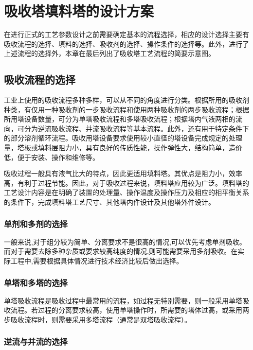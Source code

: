 \chapter{吸收塔填料塔的设计方案}

在进行正式的工艺参数设计之前需要确定基本的流程选择，相应的设计选择主要有吸收流程的选择、填料的选择、吸收剂的选择、操作条件的选择等。此外，进行了上述流程的选择外，本章在最后列出了吸收塔工艺流程的简要示意图。

\section{吸收流程的选择}

工业上使用的吸收流程多种多样，可以从不同的角度进行分类。根据所用的吸收剂种类，有仅用一种吸收剂的一步吸收流程和使用两种吸收剂的两步吸收流程；根据所用塔设备数量，可分为单塔吸收流程和多塔吸收流程；根据塔内气液两相的流向，可分为逆流吸收流程、并流吸收流程等基本流程。此外，还有用于特定条件下的部分溶剂循环流程。吸收用塔设备要求使用较小直径的塔设备完成规定的处理量，塔板或填料层阻力小，具有良好的传质性能，操作弹性大，结构简单，造价低，便于安装、操作和维修等。

吸收过程一般具有液气比大的特点，因此更适用填料塔。其优点是阻力小，效率高，有利于过程节能。因此，对于吸收过程来说，填料塔应用较为广泛。填料塔的工艺设计内容是在明确了装置的处理量、操作温度及操作压力及相应的相平衡关系的条件下，完成填料塔工艺尺寸、其他塔内件设计及其他塔外件设计。

\subsection{单剂和多剂的选择}

一般来说,对于组分较为简单、分离要求不是很高的情况,可以优先考虑单剂吸收。而对于需要去除多种杂质或要求较高纯度的情况,则可能需要采用多剂吸收。在实际工程中,需要根据具体情况进行技术经济比较后做出选择。


\subsection{单塔和多塔的选择}

单塔吸收流程是吸收过程中最常用的流程，如过程无特别需要，则一般采用单塔吸收流程。若过程的分离要求较高，使用单塔操作时，所需要的塔体过高，或采用两步吸收流程时，则需要采用多塔流程（通常是双塔吸收流程）。

\subsection{逆流与并流的选择}

